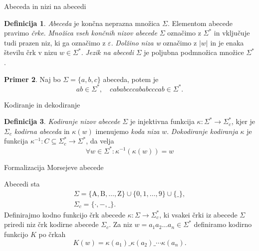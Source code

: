 \documentclass{beamer}
\theoremstyle{definition} %
\newtheorem{definicija}{Definicija}[section]
\newtheorem{primer}[definicija]{Primer}
\theoremstyle{plain} %
\begin{document}
\begin{frame}{Abeceda in nizi na abecedi}
    
    \begin{definicija}

        \textit{Abeceda} je končna neprazna množica $ \Sigma $. Elementom abecede pravimo \textit{črke}.
        \textit{Množica vseh končnih nizov abecede} $ \Sigma $ označimo z $ \Sigma^* $ in vključuje tudi
        prazen niz, ki ga označimo z $ \varepsilon $. \textit{Dolžino niza w} označimo z $ |w| $ in je 
        enaka številu črk v nizu $ w \in \Sigma^* $. \textit{Jezik na abecedi} $ \Sigma $ je poljubna
        podmnožica množice $ \Sigma^* $. 
    
    \end{definicija}

    \pause
    
    \begin{primer}

    Naj bo $ \Sigma = \{ a,b,c \} $ abeceda, potem je
    \[ 
        ab \in \Sigma^* , \quad cababcccababcccab \in \Sigma^*.
    \]

    \end{primer}

\end{frame}

\begin{frame}{Kodiranje in dekodiranje}
    
    \begin{definicija}
    
        \textit{Kodiranje nizov abecede} $ \Sigma $ je injektivna funkcija $ \kappa \colon \Sigma^* 
        \to \Sigma_c^* $, kjer je $ \Sigma_c $ \textit{kodirna abeceda} in $ \kappa(w) $ imenujemo
        \textit{koda niza} $ w $. \textit{Dokodiranje kodiranja} $ \kappa $ je funkcija 
        $ \kappa^{-1} \colon C \subseteq \Sigma^*_c \to \Sigma^* $, da velja
        \[
            \forall w \in \Sigma^* \colon \kappa^{-1}(\kappa(w)) = w
        \]
    
    \end{definicija}

\end{frame}

\begin{frame}{Formalizacija Morsejeve abecede}

    Abecedi sta
    \begin{gather*}
        \Sigma = \{ \text{A},  \text{B}, \ldots, \text{Z} \} \cup \{ 0, 1, \ldots, 9 \} \cup \{ \_ \}, \\
        \Sigma_c = \{ \cdot ,-, \_ \}.
    \end{gather*}
    Definirajmo kodno funkcijo črk abecede $ \kappa \colon \Sigma \to \Sigma_c^* $, ki vsakei črki iz abecede
    $ \Sigma $ priredi niz črk kodirne abecede $ \Sigma_c $. Za niz $ w = a_1a_2 \ldots a_n \in \Sigma^* $
    definiramo kodirno funkcijo $ K $ po črkah
    \[
        K(w) = \kappa(a_1)\_\kappa(a_2)\_\cdots\kappa(a_n).
    \]

\end{frame}
\end{document}
